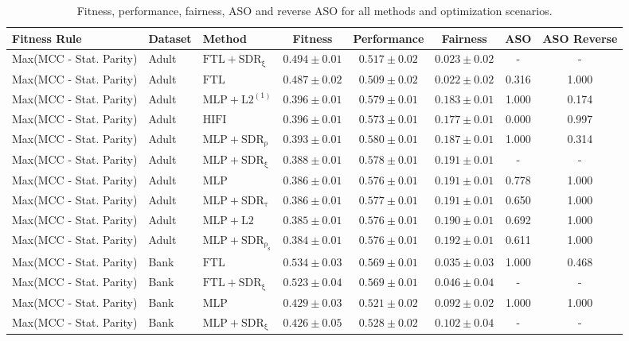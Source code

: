 \begin{table}[htbp]
\centering
\caption{Fitness, performance, fairness, ASO and reverse ASO for all methods and optimization scenarios.}
\label{tab:perf_fair_aso_summary}
\begin{tabular}{lllccccc}
\toprule
Fitness Rule & Dataset & Method & Fitness & Performance & Fairness & ASO & ASO Reverse \\
\midrule
Max(MCC - Stat. Parity) & Adult & $\mathrm{FTL+SDR_{\xi}}$ & $0.494 \pm0.01$ & $0.517 \pm0.02$ & $0.023 \pm0.02$ & - & - \\
Max(MCC - Stat. Parity) & Adult & $\mathrm{FTL}$ & $0.487 \pm0.02$ & $0.509 \pm0.02$ & $0.022 \pm0.02$ & 0.316 & 1.000 \\
Max(MCC - Stat. Parity) & Adult & $\mathrm{MLP+L2^{(1)}}$ & $0.396 \pm0.01$ & $0.579 \pm0.01$ & $0.183 \pm0.01$ & 1.000 & 0.174 \\
Max(MCC - Stat. Parity) & Adult & $\mathrm{HIFI}$ & $0.396 \pm0.01$ & $0.573 \pm0.01$ & $0.177 \pm0.01$ & 0.000 & 0.997 \\
Max(MCC - Stat. Parity) & Adult & $\mathrm{MLP+SDR_{\rho}}$ & $0.393 \pm0.01$ & $0.580 \pm0.01$ & $0.187 \pm0.01$ & 1.000 & 0.314 \\
Max(MCC - Stat. Parity) & Adult & $\mathrm{MLP+SDR_{\xi}}$ & $0.388 \pm0.01$ & $0.578 \pm0.01$ & $0.191 \pm0.01$ & - & - \\
Max(MCC - Stat. Parity) & Adult & $\mathrm{MLP}$ & $0.386 \pm0.01$ & $0.576 \pm0.01$ & $0.191 \pm0.01$ & 0.778 & 1.000 \\
Max(MCC - Stat. Parity) & Adult & $\mathrm{MLP+SDR_{\tau}}$ & $0.386 \pm0.01$ & $0.577 \pm0.01$ & $0.191 \pm0.01$ & 0.650 & 1.000 \\
Max(MCC - Stat. Parity) & Adult & $\mathrm{MLP+L2}$ & $0.385 \pm0.01$ & $0.576 \pm0.01$ & $0.190 \pm0.01$ & 0.692 & 1.000 \\
Max(MCC - Stat. Parity) & Adult & $\mathrm{MLP+SDR_{\rho_s}}$ & $0.384 \pm0.01$ & $0.576 \pm0.01$ & $0.192 \pm0.01$ & 0.611 & 1.000 \\
Max(MCC - Stat. Parity) & Bank & $\mathrm{FTL}$ & $0.534 \pm0.03$ & $0.569 \pm0.01$ & $0.035 \pm0.03$ & 1.000 & 0.468 \\
Max(MCC - Stat. Parity) & Bank & $\mathrm{FTL+SDR_{\xi}}$ & $0.523 \pm0.04$ & $0.569 \pm0.01$ & $0.046 \pm0.04$ & - & - \\
Max(MCC - Stat. Parity) & Bank & $\mathrm{MLP}$ & $0.429 \pm0.03$ & $0.521 \pm0.02$ & $0.092 \pm0.02$ & 1.000 & 1.000 \\
Max(MCC - Stat. Parity) & Bank & $\mathrm{MLP+SDR_{\xi}}$ & $0.426 \pm0.05$ & $0.528 \pm0.02$ & $0.102 \pm0.04$ & - & - \\

\end{tabular}
\end{table}

